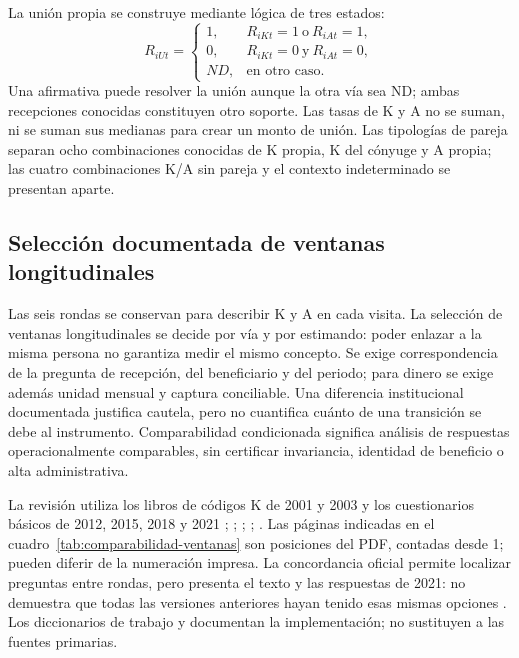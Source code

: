 La unión propia se construye mediante lógica de tres estados:
\begin{equation}
 R_{iUt}=
 \begin{cases}
 1,&R_{iKt}=1\ \text{o}\ R_{iAt}=1,\\
 0,&R_{iKt}=0\ \text{y}\ R_{iAt}=0,\\
 ND,&\text{en otro caso}.
 \end{cases}
 \label{eq:union-propia}
\end{equation}
Una afirmativa puede resolver la unión aunque la otra vía sea ND; ambas
recepciones conocidas constituyen otro soporte. Las tasas de K y A no se
suman, ni se suman sus medianas para crear un monto de unión. Las tipologías
de pareja separan ocho combinaciones conocidas de K propia, K del cónyuge
y A propia; las cuatro combinaciones K/A sin pareja y el contexto
indeterminado se presentan aparte.

\subsection{Selección documentada de ventanas longitudinales}
\label{sec:comparabilidad-ventanas}

Las seis rondas se conservan para describir K y A en cada visita.
La selección de ventanas longitudinales se decide por vía y por estimando:
poder enlazar a la misma persona no garantiza medir el mismo concepto.
Se exige correspondencia de la pregunta de recepción, del beneficiario y
del periodo; para dinero se exige además unidad mensual y captura conciliable.
Una diferencia institucional documentada justifica cautela, pero no cuantifica
cuánto de una transición se debe al instrumento. Comparabilidad condicionada
significa análisis de respuestas operacionalmente comparables, sin certificar
invariancia, identidad de beneficio o alta administrativa.

La revisión utiliza los libros de códigos K de 2001 y 2003 y los
cuestionarios básicos de 2012, 2015, 2018 y 2021
\citep{enasem2001codigosk}; \citep{enasem2003codigosk};
\citep{enasem2012cuestionario}; \citep{enasem2015cuestionario};
\citep{inegi2018k,inegi2021k}. Las páginas indicadas
en el cuadro~\ref{tab:comparabilidad-ventanas} son posiciones del PDF,
contadas desde 1; pueden diferir de la numeración impresa.
La concordancia oficial permite localizar preguntas entre rondas, pero
presenta el texto y las respuestas de 2021: no demuestra que todas las
versiones anteriores hayan tenido esas mismas opciones
\citep[pp.~34--36 del PDF]{enasemcomparacion2021}.
Los diccionarios de trabajo 
y  documentan
la implementación; no sustituyen a las fuentes primarias.

